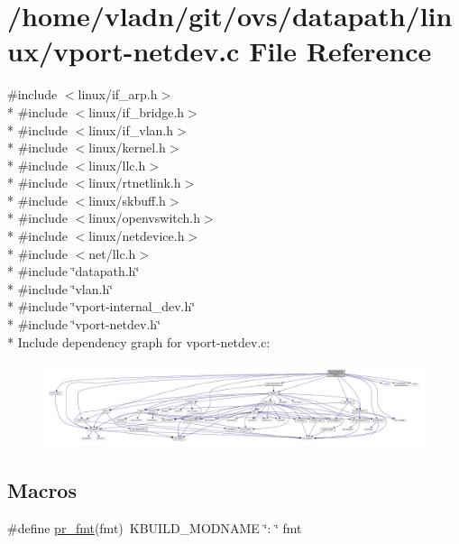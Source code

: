 \hypertarget{linux_2vport-netdev_8c}{}\section{/home/vladn/git/ovs/datapath/linux/vport-\/netdev.c File Reference}
\label{linux_2vport-netdev_8c}
{\ttfamily \#include $<$linux/if\+\_\+arp.\+h$>$}\\*
{\ttfamily \#include $<$linux/if\+\_\+bridge.\+h$>$}\\*
{\ttfamily \#include $<$linux/if\+\_\+vlan.\+h$>$}\\*
{\ttfamily \#include $<$linux/kernel.\+h$>$}\\*
{\ttfamily \#include $<$linux/llc.\+h$>$}\\*
{\ttfamily \#include $<$linux/rtnetlink.\+h$>$}\\*
{\ttfamily \#include $<$linux/skbuff.\+h$>$}\\*
{\ttfamily \#include $<$linux/openvswitch.\+h$>$}\\*
{\ttfamily \#include $<$linux/netdevice.\+h$>$}\\*
{\ttfamily \#include $<$net/llc.\+h$>$}\\*
{\ttfamily \#include \char`\"{}datapath.\+h\char`\"{}}\\*
{\ttfamily \#include \char`\"{}vlan.\+h\char`\"{}}\\*
{\ttfamily \#include \char`\"{}vport-\/internal\+\_\+dev.\+h\char`\"{}}\\*
{\ttfamily \#include \char`\"{}vport-\/netdev.\+h\char`\"{}}\\*
Include dependency graph for vport-\/netdev.c\+:
\nopagebreak
\begin{figure}[H]
\begin{center}
\leavevmode
\includegraphics[width=350pt]{linux_2vport-netdev_8c__incl}
\end{center}
\end{figure}
\subsection*{Macros}
\begin{DoxyCompactItemize}
\item 
\#define \hyperlink{linux_2vport-netdev_8c_a1f8c165bf4196327bc3abff648276d92}{pr\+\_\+fmt}(fmt)~K\+B\+U\+I\+L\+D\+\_\+\+M\+O\+D\+N\+A\+M\+E \char`\"{}\+: \char`\"{} fmt
\end{DoxyCompactItemize}
